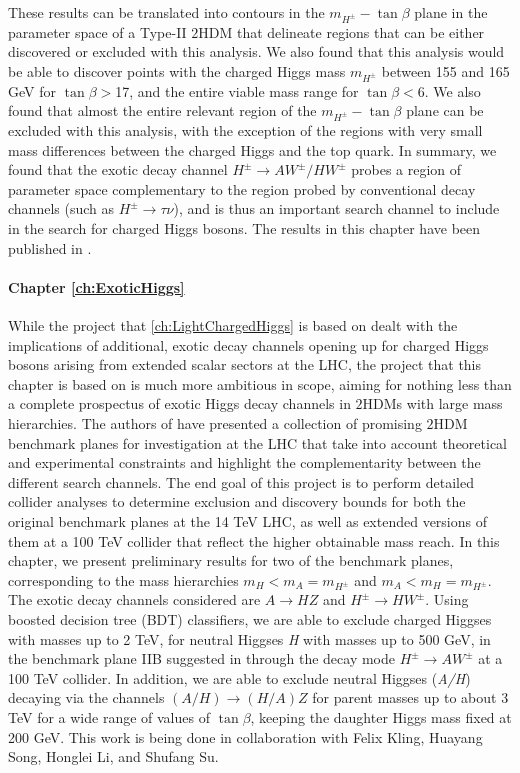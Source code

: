 These results can be translated into contours in the $m_{H^\pm}-\tan\beta$ plane in the parameter space of a Type-II $2$HDM that delineate regions that can be either discovered or excluded with this analysis. We also found that this analysis would be able to discover points with the charged Higgs mass $m_{H^\pm}$ between 155 and 165 GeV for $\tan\beta >$17, and the entire viable mass range for $\tan\beta <$6. We also found that almost the entire relevant region of the $m_{H^\pm}-\tan\beta$ plane can be excluded with this analysis, with the exception of the regions with very small mass differences between the charged Higgs and the top quark. In summary, we found that the exotic decay channel $H^\pm\rightarrow AW^\pm/HW^\pm$ probes a region of parameter space complementary to the region probed by conventional decay channels (such as $H^\pm\rightarrow \tau\nu$), and is thus an important search channel to include in the search for charged Higgs bosons. The results in this chapter have been published in \citep{Kling:2015uba}.

\paragraph{Chapter \ref{ch:ExoticHiggs}}
While the project that \autoref{ch:LightChargedHiggs} is based on dealt with the implications of additional, exotic decay channels opening up for charged Higgs bosons arising from extended scalar sectors at the LHC, the project that this chapter is based on is much more ambitious in scope, aiming for nothing less than a complete prospectus of exotic Higgs decay channels in $2$HDMs with large mass hierarchies. The authors of \citep{Kling:2016opi} have presented a collection of promising $2$HDM benchmark planes for investigation at the LHC that take into account theoretical and experimental constraints and highlight the complementarity between the different search channels. The end goal of this project is to perform detailed collider analyses to determine exclusion and discovery bounds for both the original benchmark planes at the 14 TeV LHC, as well as extended versions of them at a 100 TeV collider that reflect the higher obtainable mass reach. In this chapter, we present preliminary results for two of the benchmark planes, corresponding to the mass hierarchies $m_H < m_A = m_{H^\pm}$ and $m_A < m_H = m_{H^\pm}$. The exotic decay channels considered are $A\rightarrow HZ$ and $H^\pm\rightarrow HW^\pm$. Using boosted decision tree (BDT) classifiers, we are able to exclude charged Higgses with masses up to 2 TeV, for neutral Higgses \emph{H} with masses up to 500 GeV, in the benchmark plane IIB suggested in \cite{Kling:2016opi} through the decay mode $H^\pm\rightarrow AW^\pm$ at a 100 TeV collider. In addition, we are able to exclude neutral Higgses (\emph{A/H}) decaying via the channels $(A/H)\rightarrow (H/A)Z$ for parent masses up to about 3 TeV for a wide range of values of $\tan\beta$, keeping the daughter Higgs mass fixed at 200 GeV.
This work is being done in collaboration with Felix Kling, Huayang Song, Honglei Li, and Shufang Su.

